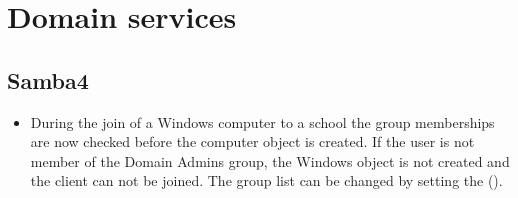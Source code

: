 

 

\section{Domain services}

\subsection{Samba4}
\begin{itemize}
\item During the join of a Windows computer to a school the group memberships are now
 checked before the computer object is created. If the user is not member of the Domain Admins
 group, the Windows object is not created and the client can not be joined. The group list can be
 changed by setting the  ().
\end{itemize}



